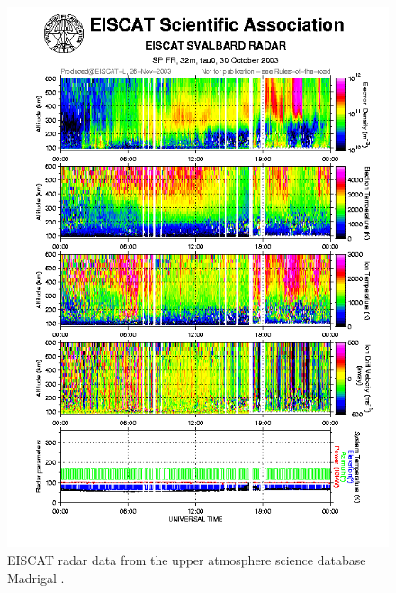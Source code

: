\begin{figure}
\centering
\includegraphics[width=.9\textwidth]{figures/2003-10-30_SvalvardPlot.png}
\caption{EISCAT radar data from the upper atmosphere science database Madrigal \cite{madrigal}.}
\label{fig:madrigal}
\end{figure}